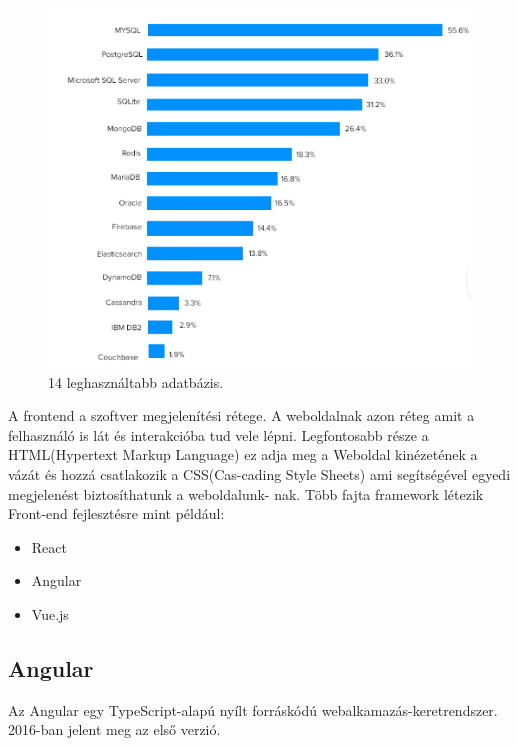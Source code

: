 \begin{figure}[h]
\centering
\includegraphics[scale=0.6]{images/top14_database.png}
\caption{14 leghasználtabb adatbázis.\cite{databases}}
\label{fig:Adatbázisok}
\end{figure}
\newpage


A frontend a szoftver megjelenítési rétege. A weboldalnak azon réteg amit a felhasználó is lát és interakcióba tud vele lépni. Legfontosabb része a HTML(Hypertext Markup Language) ez adja meg a Weboldal kinézetének a vázát és hozzá csatlakozik a CSS(Cas-cading Style Sheets) ami segítségével egyedi megjelenést biztosíthatunk a weboldalunk-
nak. Több fajta framework létezik Front-end fejlesztésre mint például:

\begin{itemize}
\item React
\item Angular
\item Vue.js
\end{itemize}


\subsection{Angular}

Az Angular egy TypeScript-alapú nyílt forráskódú webalkamazás-keretrendszer. 2016-ban jelent meg az első verzió.

